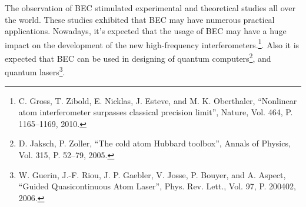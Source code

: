 \documentclass[candidate, href, colorlinks]{disser}
\begin{document}
The observation of BEC stimulated experimental and theoretical studies all over the world.
These studies exhibited that BEC may have numerous practical applications.
Nowadays, it's expected that the usage of BEC may have a huge impact on the development of the new high-frequency interferometers.\footnote{C. Gross, T. Zibold, E. Nicklas, J. Esteve, and M. K. Oberthaler, ``Nonlinear atom interferometer surpasses classical precision limit'', Nature, Vol. 464, P. 1165--1169, 2010.}.
Also it is expected that BEC can be used in designing of quantum computers\footnote{D. Jaksch, P. Zoller, ``The cold atom Hubbard toolbox'', Annals of Physics, Vol. 315, P. 52--79, 2005.}, and quantum lasers\footnote{W. Guerin, J.-F. Riou, J. P. Gaebler, V. Josse, P. Bouyer, and A. Aspect, ``Guided Quasicontinuous Atom Laser'', Phys. Rev. Lett., Vol. 97, P. 200402, 2006.}.
\end{document}

